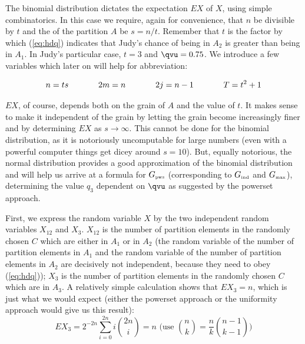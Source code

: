 \documentclass[phd,12pt,oneside]{ubcthesis}
\begin{document}
The binomial distribution dictates the expectation $EX$ of $X$, using
simple combinatorics. In this case we require, again for convenience,
that $n$ be divisible by $t$ and the  of the partition
$A$ be $s=n/t$. Remember that $t$ is the factor by which
({\ref{eq:hdq}}) indicates that Judy's chance of being in $A_{2}$ is
greater than being in $A_{1}$. In Judy's particular case, $t=3$ and
${\qvu}=0.75$. We introduce a few variables which later on will help
for abbreviation:

\begin{equation}
  \label{eq:naibepha}
n=ts\hspace{.5in}
2m=n\hspace{.5in}
2j=n-1\hspace{.5in}
{T}=t^{2}+1
\end{equation}

$EX$, of course, depends both on the grain of $A$ and the value of
$t$. It makes sense to make it independent of the grain by letting the
grain become increasingly finer and by determining $EX$ as
$s\rightarrow\infty$. This cannot be done for the binomial
distribution, as it is notoriously uncomputable for large numbers
(even with a powerful computer things get dicey around $s=10$). But,
equally notorious, the normal distribution provides a good
approximation of the binomial distribution and will help us arrive at
a formula for $G_{\mbox{\tiny pws}}$ (corresponding to 
$G_{\mbox{\tiny ind}}$ and $G_{\mbox{\tiny max}}$), determining the value $q_{3}$
dependent on ${\qvu}$ as suggested by the powerset approach.

First, we express the random variable $X$ by the two independent
random variables $X_{12}$ and $X_{3}$. $X_{12}$ is the number of
partition elements in the randomly chosen $C$ which are either in
$A_{1}$ or in $A_{2}$ (the random variable of the number of partition
elements in $A_{1}$ and the random variable of the number of partition
elements in $A_{2}$ are decisively not independent, because they need
to obey ({\ref{eq:hdq}})); $X_{3}$ is the number of partition elements
in the randomly chosen $C$ which are in $A_{3}$. A relatively simple
calculation shows that $EX_{3}=n$, which is just what we would expect
(either the powerset approach or the uniformity approach would give us
this result):
\begin{equation}
  \label{eq:kuquoosu}
  EX_{3}=2^{-2n}\sum_{i=0}^{2n}i\binom{2n}{i}=n\mbox{ (use }\binom{n}{k}=\frac{n}{k}\binom{n-1}{k-1}\mbox{)}
\end{equation}
\end{document}
